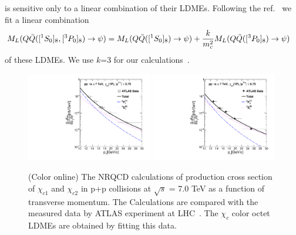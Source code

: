 \documentclass[aps,prc,preprint,superscriptaddress,showpacs,showkeys,amsmath]{revtex4-1}
\begin{document}
is sensitive only to a linear combination of their LDMEs.
Following the ref.~\cite{Cho:1995vh,Beneke:1996yw} we fit a linear combination 
\begin{equation}
\begin{split}
  M_{L}(Q{\bar{Q}}([^1S_0]_{8},[^3P_0]_{8})\rightarrow \psi)&= M_{L}(Q{\bar{Q}}([^1S_0]_{8})\rightarrow \psi) + \frac{k}{m_{c}^{2}}
  M_{L}(Q{\bar{Q}}([^3P_0]_{8})\rightarrow \psi)
\end{split}
\end{equation}
of these LDMEs. We use $k$=3 for our calculations~\cite{Cho:1995vh,Beneke:1996yw}.  
\begin{figure}
\includegraphics[width=0.49\textwidth]{Chic1_ATLAS_Fit.pdf}
\includegraphics[width=0.49\textwidth]{Chic2_ATLAS_Fit.pdf}
\caption{(Color online) The NRQCD calculations of production cross section 
of  $\chi_{c1}$ and $\chi_{c2}$ in p+p collisions at
$\sqrt{s}$ = 7.0 TeV as a function of transverse momentum. 
The Calculations are compared with the measured data by
ATLAS experiment at LHC~\cite{ATLAS:2014ala}. The $\chi_{c}$
color octet LDMEs are obtained by fitting this data. 
}
\label{Fig:LDMEChicATLAS}
\end{figure}
\end{document}
